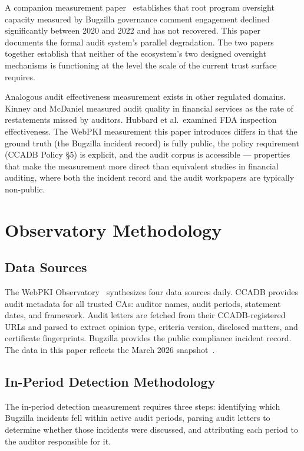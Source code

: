 \documentclass[10pt,twocolumn,letterpaper]{article}
\begin{document}
A companion measurement paper~\cite{sister} establishes that root program oversight
capacity measured by Bugzilla governance comment engagement declined
significantly between 2020 and 2022 and has not recovered. This paper
documents the formal audit system's parallel degradation. The two
papers together establish that neither of the ecosystem's two designed
oversight mechanisms is functioning at the level the scale of the
current trust surface requires.

Analogous audit effectiveness measurement exists in other regulated
domains. Kinney and McDaniel measured audit quality in financial
services as the rate of restatements missed by auditors. Hubbard et al.\
examined FDA inspection effectiveness. The WebPKI measurement this
paper introduces differs in that the ground truth (the Bugzilla incident
record) is fully public, the policy requirement (CCADB Policy \S5) is
explicit, and the audit corpus is accessible --- properties that make
the measurement more direct than equivalent studies in financial
auditing, where both the incident record and the audit workpapers
are typically non-public.

\section{Observatory Methodology}
\label{sec:methodology}

\subsection{Data Sources}
The WebPKI Observatory~\cite{github} synthesizes four data sources daily.
CCADB provides audit metadata for all trusted CAs: auditor names, audit
periods, statement dates, and framework. Audit letters are fetched from
their CCADB-registered URLs and parsed to extract opinion type, criteria
version, disclosed matters, and certificate fingerprints. Bugzilla provides
the public compliance incident record. The data in this paper reflects
the March 2026 snapshot~\cite{snapshot}.

\subsection{In-Period Detection Methodology}
\label{sec:methodology-detection}

The in-period detection measurement requires three steps: identifying
which Bugzilla incidents fell within active audit periods, parsing audit
letters to determine whether those incidents were discussed, and
attributing each period to the auditor responsible for it.
\end{document}
